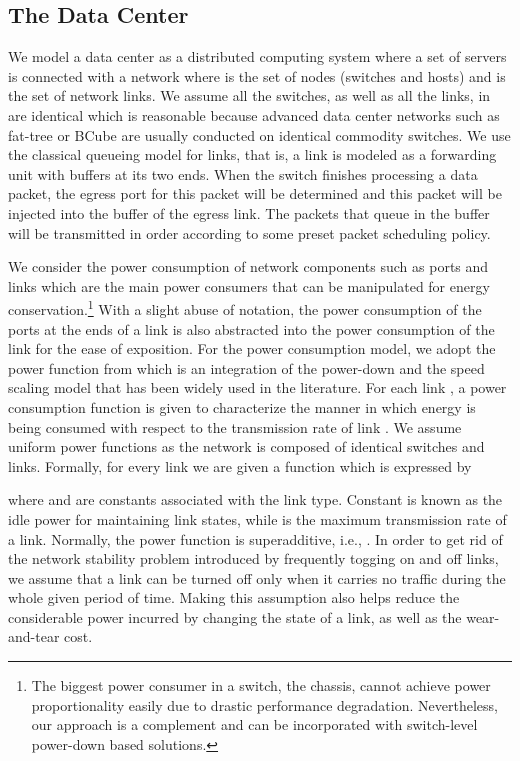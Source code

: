 \documentclass[10pt, conference, compsocconf]{IEEEtran}
\begin{document}
\subsection{The Data Center}

We model a data center as a distributed computing system where a set of servers is connected with a network  where  is the set of nodes (switches and hosts) and  is the set of network links. We assume all the switches, as well as all the links, in  are identical which is reasonable because advanced data center networks such as fat-tree \cite{Al-Fares_Loukissas-FatTree-2008} or BCube \cite{Guo_Lu-BCube-2009} are usually conducted on identical commodity switches. We use the classical queueing model for links, that is, a link is modeled as a forwarding unit with buffers at its two ends. When the switch finishes processing a data packet, the egress port for this packet will be determined and this packet will be injected into the buffer of the egress link. The packets that queue in the buffer will be transmitted in order according to some preset packet scheduling policy.

We consider the power consumption of network components such as ports and links which are the main power consumers that can be manipulated for energy conservation.\footnote{The biggest power consumer in a switch, the chassis, cannot achieve power proportionality easily due to drastic performance degradation. Nevertheless, our approach is a complement and can be incorporated with switch-level power-down based solutions.} With a slight abuse of notation, the power consumption of the ports at the ends of a link is also abstracted into the power consumption of the link for the ease of exposition. For the power consumption model, we adopt the power function from \cite{Andrews_Fernandez-SS-2010} which is an integration of the power-down and the speed scaling model that has been widely used in the literature. For each link , a power consumption function  is given to characterize the manner in which energy is being consumed with respect to the transmission rate  of link . We assume uniform power functions as the network is composed of identical switches and links. Formally, for every link we are given a function  which is expressed by

where  and  are constants associated with the link type. Constant  is known as the idle power for maintaining link states, while  is the maximum transmission rate of a link.
Normally, the power function  is superadditive, i.e., . In order to get rid of the network stability problem introduced by frequently togging on and off links, we assume that a link can be turned off only when it carries no traffic during the whole given period of time. Making this assumption also helps reduce the considerable power incurred by changing the state of a link, as well as the wear-and-tear cost.
\end{document}
